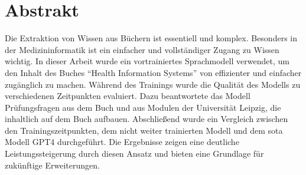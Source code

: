 \chapter*{Abstrakt}
Die Extraktion von Wissen aus Büchern ist essentiell und komplex.
Besonders in der Medizininformatik ist ein einfacher und vollständiger Zugang zu Wissen wichtig.
In dieser Arbeit wurde ein vortrainiertes Sprachmodell verwendet, um den Inhalt des Buches \enquote{Health Information Systems} von \citet{bb} effizienter und einfacher zugänglich zu machen.
Während des Trainings wurde die Qualität des Modells zu verschiedenen Zeitpunkten evaluiert.
Dazu beantwortete das Modell Prüfungsfragen aus dem Buch und aus Modulen der Universität Leipzig, die inhaltlich auf dem Buch aufbauen.
Abschließend wurde ein Vergleich zwischen den Trainingszeitpunkten, dem nicht weiter trainierten Modell und dem \ac{sota} Modell GPT4 durchgeführt.
Die Ergebnisse zeigen eine deutliche Leistungssteigerung durch diesen Ansatz und bieten eine Grundlage für zukünftige Erweiterungen.
\vfill
